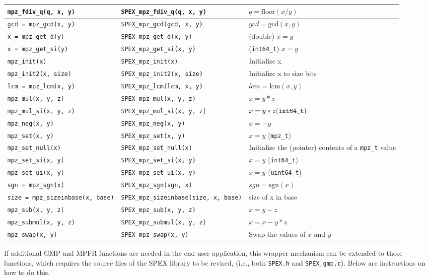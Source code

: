 \documentclass[12pt,oneside]{book}
\theoremstyle{definition}
\newenvironment{SizedCenteredTabular}[2][\small]
    {   
        #1\begin{center}\begin{tabular}{#2}
    }{ 
        \end{tabular}\end{center}
    }
\begin{document}
\begin{SizedCenteredTabular}[\scriptsize]{|l|l|p{2in}|}
\verb|mpz_fdiv_q(q, x, y)|& \verb|SPEX_mpz_fdiv_q(q, x, y)|& $q = \text{floor}(x/y)$ \\ \hline
\verb|gcd = mpz_gcd(x, y)|& \verb|SPEX_mpz_gcd(gcd, x, y)|& $gcd = \text{gcd}(x,y)$\\ \hline
\verb|x = mpz_get_d(y)|& \verb|SPEX_mpz_get_d(x, y)|&  (double) $x = y$\\ \hline
\verb|x = mpz_get_si(y)|& \verb|SPEX_mpz_get_si(x, y)|& (\verb|int64_t|) $x = y$ \\ \hline
\verb|mpz_init(x)|& \verb|SPEX_mpz_init(x)|& Initialize x \\ \hline
\verb|mpz_init2(x, size)|& \verb|SPEX_mpz_init2(x, size)|& Initialize x to size bits \\ \hline
\verb|lcm = mpz_lcm(x, y)|& \verb|SPEX_mpz_lcm(lcm, x, y)|& $lcm = \text{lcm}(x,y)$ \\ \hline
\verb|mpz_mul(x, y, z)|& \verb|SPEX_mpz_mul(x, y, z)|& $x = y*z$ \\ \hline
\verb|mpz_mul_si(x, y, z)|& \verb|SPEX_mpz_mul_si(x, y, z)|& $x = y*z (\verb|int64_t|)$ \\ \hline
\verb|mpz_neg(x, y)|& \verb|SPEX_mpz_neg(x, y)|& $x = -y$ \\ \hline
\verb|mpz_set(x, y)|& \verb|SPEX_mpz_set(x, y)| & $x = y$ (\verb|mpz_t|) \\ \hline
\verb|mpz_set_null(x)| & \verb|SPEX_mpz_set_null(x)| & Initialize the (pointer) contents of a \verb|mpz_t| value \\ \hline
\verb|mpz_set_si(x, y)|& \verb|SPEX_mpz_set_si(x, y)|& $x = y$ (\verb|int64_t|) \\ \hline
\verb|mpz_set_ui(x, y)|& \verb|SPEX_mpz_set_ui(x, y)|& $x = y$ (\verb|uint64_t|) \\ \hline
\verb|sgn = mpz_sgn(x)|& \verb|SPEX_mpz_sgn(sgn, x)|& $sgn = \text{sgn}(x)$ \\ \hline
\verb|size = mpz_sizeinbase(x, base)|& \verb|SPEX_mpz_sizeinbase(size, x, base)|& size of x in base \\ \hline 
\verb|mpz_sub(x, y, z)|& \verb|SPEX_mpz_sub(x, y, z)|& $x = y-z$ \\ \hline
\verb|mpz_submul(x, y, z)|& \verb|SPEX_mpz_submul(x, y, z)|& $x = x-y*z$ \\ \hline
\verb|mpz_swap(x, y)|& \verb|SPEX_mpz_swap(x, y)|& Swap the values of $x$ and $y$ \\ \hline
\end{SizedCenteredTabular}

If additional GMP and MPFR functions are needed in the end-user application, this wrapper mechanism can be extended to those functions, which requires the source files of the SPEX library to be revised, (i.e., both \verb|SPEX.h| and \verb|SPEX_gmp.c|).  Below are instructions on how to do this.
\end{document}
